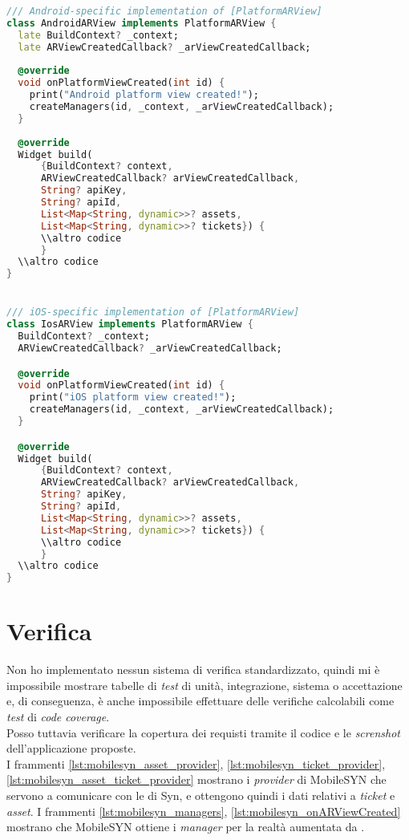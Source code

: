 \begin{lstlisting}[language=dart, label={lst:ar_view}, firstnumber=1,caption={Frammento di codice per vista in realtà aumenta in Dart}]
/// Android-specific implementation of [PlatformARView]
class AndroidARView implements PlatformARView {
  late BuildContext? _context;
  late ARViewCreatedCallback? _arViewCreatedCallback;
  
  @override
  void onPlatformViewCreated(int id) {
    print("Android platform view created!");
    createManagers(id, _context, _arViewCreatedCallback);
  }
  
  @override
  Widget build(
      {BuildContext? context,
      ARViewCreatedCallback? arViewCreatedCallback,
      String? apiKey,
      String? apiId,
      List<Map<String, dynamic>>? assets,
      List<Map<String, dynamic>>? tickets}) {
      \\altro codice
      }
  \\altro codice
}


/// iOS-specific implementation of [PlatformARView]
class IosARView implements PlatformARView {
  BuildContext? _context;
  ARViewCreatedCallback? _arViewCreatedCallback;

  @override
  void onPlatformViewCreated(int id) {
    print("iOS platform view created!");
    createManagers(id, _context, _arViewCreatedCallback);
  }

  @override
  Widget build(
      {BuildContext? context,
      ARViewCreatedCallback? arViewCreatedCallback,
      String? apiKey,
      String? apiId,
      List<Map<String, dynamic>>? assets,
      List<Map<String, dynamic>>? tickets}) {
      \\altro codice
      }
  \\altro codice
}
\end{lstlisting}

\section{Verifica}
\label{sec:copertura_requisiti}
Non ho implementato nessun sistema di verifica standardizzato, quindi mi è impossibile mostrare tabelle di \textit{test} di unità, integrazione, sistema o accettazione e, di conseguenza, è anche impossibile effettuare delle verifiche calcolabili come \textit{test} di \textit{code coverage}.\\
Posso tuttavia verificare la copertura dei requisti tramite il codice e le \textit{screnshot} dell'applicazione proposte.\\
I frammenti \ref{lst:mobilesyn_asset_provider}, \ref{lst:mobilesyn_ticket_provider}, \ref{lst:mobilesyn_asset_ticket_provider} mostrano i \textit{provider} di MobileSYN che servono a comunicare con le \api{} di Syn, e ottengono quindi i dati relativi a \textit{ticket} e \textit{asset}.
I frammenti \ref{lst:mobilesyn_managers}, \ref{lst:mobilesyn_onARViewCreated} mostrano che MobileSYN ottiene i \textit{manager} per la realtà aumentata da \aplug{}.


